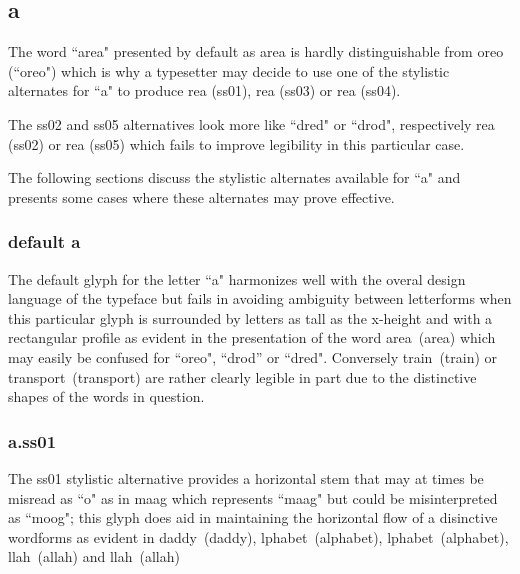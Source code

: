 \subsection{a}

The word ``area" presented by default as {\ssdefault area} is hardly
distinguishable from {\ssdefault oreo} (``oreo") which is why a typesetter may
decide to use one of the stylistic alternates for ``a" to produce
{re{\ssone a}} (ss01),
{re{\ssthree a}} (ss03) or
{re{\ssfour a}} (ss04).

The ss02 and ss05 alternatives look more like ``dred" or ``drod", respectively
{re{\sstwo a}} (ss02) or
{re{\ssfive a}} (ss05)
which fails to improve legibility in this particular case.

The following sections discuss the stylistic alternates available for ``a" and
presents some cases where these alternates may prove effective.

\subsubsection{default {\ssdefault a}}

The default glyph for the letter ``a" harmonizes well with the overal design
language of the typeface but fails in avoiding ambiguity between letterforms
when this particular glyph is surrounded by letters as tall as the x-height and
with a rectangular profile as evident in the presentation of the word
\mbox{{\ssdefault area} (area)} which may easily be confused for ``oreo",
``drod'' or ``dred".
Conversely
\mbox{{\ssdefault train} (train)} or
\mbox{{\ssdefault transport} (transport)}
are rather clearly legible in part due to the distinctive shapes of the words
in question.

\subsubsection{{\ssone a}.ss01}
The ss01 stylistic alternative provides a horizontal stem that may at times be
misread as ``o" as in \mbox{\ssdefault m{\ssone aa}g} which represents
``maag" but could be misinterpreted as ``moog"; this glyph does aid in
maintaining the horizontal flow of a disinctive wordforms as evident in
\mbox{{\ssdefault d{\ssone a}ddy} (daddy)},
\mbox{{lphabet} (alphabet)},
\mbox{{lph{\ssone a}bet} (alphabet)},
\mbox{{llah} (allah)} and
\mbox{{ll{\ssone a}h} (allah)}

